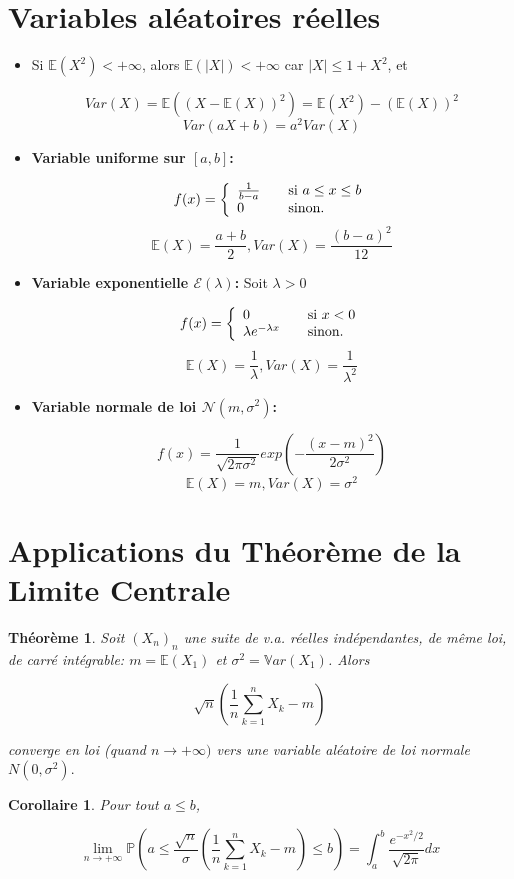 \documentclass[10pt,a4paper,oneside]{article}
\newtheorem{theoreme}{Théorème}
\newtheorem{corollaire}{Corollaire}
\begin{document}
\section{Variables aléatoires réelles}

\begin{itemize}
\item
Si $\mathbb{E}(X^2) < +\infty$, alors $\mathbb{E}(|X|) < +\infty$ car $|X| \leq 1 + X^2$, et

\[ Var(X) = \mathbb{E}((X - \mathbb{E}(X))^2) = \mathbb{E}(X^2) - (\mathbb{E}(X))^2 \]
\[ Var(aX + b) = a^2Var(X) \]

\item
\textbf{Variable uniforme sur $[a,b]$:}

\[ f(x) = \left\{ 
  \begin{array}{l l }
    \frac{1}{b - a} & \quad \text{si }a \leq x \leq b\\
    0 & \quad \text{sinon.}
  \end{array} \right.\]
\[ \mathbb{E}(X) = \frac{a + b}{2}, Var(X) = \frac{(b - a)^2}{12} \]

\item
\textbf{Variable exponentielle $\mathcal{E}(\lambda)$:} Soit $\lambda > 0$

\[ f(x) = \left\{ 
  \begin{array}{l l }
    0 & \quad \text{si }x < 0\\
    \lambda e^{-\lambda x} & \quad \text{sinon.}
  \end{array} \right.\]
\[ \mathbb{E}(X) = \frac{1}{\lambda}, Var(X) = \frac{1}{\lambda^2} \]

\item
\textbf{Variable normale de loi $\mathcal{N}(m,\sigma^2)$:}

\[ f(x) = \frac{1}{\sqrt{2 \pi \sigma^2}} exp(-\frac{(x - m)^2}{2 \sigma^2}) \]
\[ \mathbb{E}(X) = m, Var(X) = \sigma^2 \]

\end{itemize}

\section{Applications du Théorème de la Limite Centrale}

\begin{theoreme}
Soit $(X_n)_n$ une suite de v.a. réelles indépendantes, de même loi, de carré intégrable: $m = \mathbb{E}(X_1)$ et $\sigma^2 = \mathbb{V}ar(X_1)$. Alors

\[ \sqrt{n}(\frac{1}{n}\sum_{k = 1}^n X_k - m) \]

converge en loi (quand $n \to +\infty)$ vers une variable aléatoire de loi normale $N(0,\sigma^2).$
\end{theoreme}


\begin{corollaire}
Pour tout $a \leq b$,

\[ \lim\limits_{n \to +\infty} \mathbb{P}( a \leq \frac{\sqrt{n}}{\sigma}(\frac{1}{n}\sum_{k = 1}^n X_k - m) \leq b ) = \int_{a}^{b}  \frac{e^{ -x^2/2 }}{\sqrt{2 \pi }} dx \]
\end{corollaire}
\end{document}
